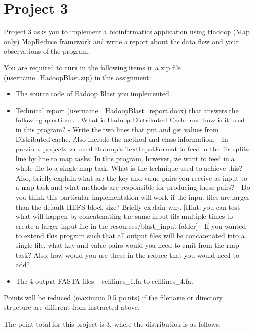 

\chapter{Project 3}\label{project-3}

Project 3 asks you to implement a bioinformatics application using
Hadoop (Map only) MapReduce framework and write a report about the data
flow and your observations of the program.

You are required to turn in the following items in a zip file
(username\_HadoopBlast.zip) in this assignment:

\begin{itemize}
\tightlist
\item
  The source code of Hadoop Blast you implemented.
\item
  Technical report (username \_HadoopBlast\_report.docx) that answers
  the following questions. - What is Hadoop Distributed Cache and how is
  it used in this program? - Write the two lines that put and get values
  from Distributed cache. Also include the method and class information.
  - In previous projects we used Hadoop's TextInputFormat to feed in the
  file splits line by line to map tasks. In this program, however, we
  want to feed in a whole file to a single map task. What is the
  technique used to achieve this? Also, briefly explain what are the key
  and value pairs you receive as input to a map task and what methods
  are responsible for producing these pairs? - Do you think this
  particular implementation will work if the input files are larger than
  the default HDFS block size? Briefly explain why. [Hint: you can
  test what will happen by concatenating the same input file multiple
  times to create a larger input file in the resources/blast\_input
  folder] - If you wanted to extend this program such that all output
  files will be concatenated into a single file, what key and value
  pairs would you need to emit from the map task? Also, how would you
  use these in the reduce that you would need to add?
\item
  The 4 output FASTA files -- celllines\_1.fa to celllines\_4.fa.
\end{itemize}

Points will be reduced (maximum 0.5 points) if the filename or directory
structure are different from instructed above.

The point total for this project is 3, where the distribution is as
follows:


